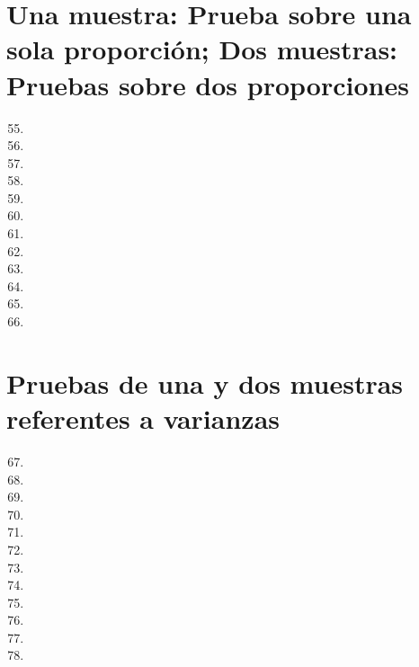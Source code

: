 \documentclass[a4paper,11pt]{article}
\theoremstyle{teoremas}
\theoremstyle{ejemplos}
\theoremstyle{definiciones}
\theoremstyle{lemas}
\begin{document}
\newpage

\section{Una muestra: Prueba sobre una sola proporci\'on; Dos muestras: Pruebas sobre dos proporciones}

\begin{enumerate}
 \setcounter{enumi}{54}
 \item 
 \newpage
 \item 
 \item 
 \item 
 \item 
 \item 
 \item 
 \item 
 \item 
 \newpage
 \item 
 \item 
 \item 
\end{enumerate}

\newpage

\section{Pruebas de una y dos muestras referentes a varianzas}

\begin{enumerate}
 \setcounter{enumi}{66}
 \item 
 \item 
 \newpage
 \item 
 \item 
 \item 
 \item 
 \item 
 \item 
 \newpage
 \item 
 \item 
 \item 
 \item 
\end{enumerate}
\end{document}
